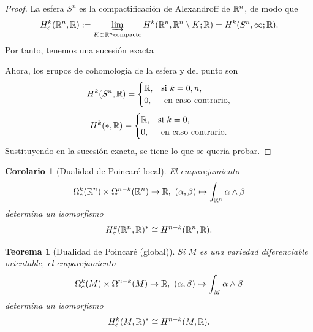 \documentclass[11pt,a4paper]{amsbook}
\newtheorem{thm}[subsection]{Teorema}
\newtheorem{corol}[subsection]{Corolario}
\theoremstyle{remark} \newtheorem{rmk}[subsection]{Observación}
\theoremstyle{definition} \newtheorem{defn}[subsection]{Definición}
\theoremstyle{definition} \newtheorem{ex}[subsection]{Ejemplo}
\theoremstyle{definition} \newtheorem{ej}[subsection]{Ejercicio}
\begin{document}
\begin{proof}
  La esfera $S^n$ es la compactificación de Alexandroff de $\mathbb R^n$, de modo que
\begin{equation*}
H_c^k(\mathbb R^n,\mathbb R) := \varinjlim_{K\subset \mathbb R^n \text{compacto}} H^k(\mathbb R^n,\mathbb R^n \setminus K; \mathbb R) = H^k(S^n,\infty;\mathbb R).
\end{equation*}
Por tanto, tenemos una sucesión exacta
\begin{center}
\end{center}
Ahora, los grupos de cohomología de la esfera y del punto son
\begin{equation*}
  H^k(S^n,\mathbb R) =
  \begin{cases}
    \mathbb R, & \text{si } k=0,n,\\
    0, & \text{ en caso contrario},
\end{cases}
\end{equation*}
\begin{equation*}
  H^k(*,\mathbb R) =
  \begin{cases}
    \mathbb R, & \text{si } k=0,\\
    0, & \text{ en caso contrario}.
\end{cases}
\end{equation*}
Sustituyendo en la sucesión exacta, se tiene lo que se quería probar.
\end{proof}

\begin{corol}[Dualidad de Poincaré local]
  El emparejamiento
  \begin{equation*}
\Omega^{k}_c(\mathbb R^n) \times \Omega^{n-k}(\mathbb R^n) \rightarrow \mathbb R,\ (\alpha,\beta) \mapsto \int_{\mathbb R^n} \alpha \wedge \beta
  \end{equation*}
  determina un isomorfismo
  \begin{equation*}
H^k_c(\mathbb R^n,\mathbb R)^* \cong H^{n-k}(\mathbb R^n,\mathbb R).
  \end{equation*}
\end{corol}

\begin{thm}[Dualidad de Poincaré (global)]
Si $M$ es una variedad diferenciable orientable, el emparejamiento
  \begin{equation*}
\Omega^{k}_c(M) \times \Omega^{n-k}(M) \rightarrow \mathbb R,\ (\alpha,\beta) \mapsto \int_{M} \alpha \wedge \beta
  \end{equation*}
  determina un isomorfismo
  \begin{equation*}
H^k_c(M,\mathbb R)^* \cong H^{n-k}(M,\mathbb R).
  \end{equation*}
\end{thm}
\end{document}
